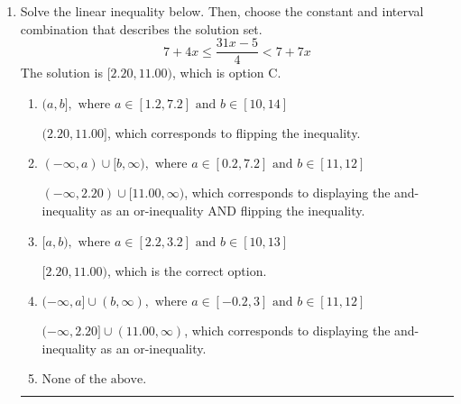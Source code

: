 \documentclass{extbook}[14pt]
\newcommand{\litem}[1]{\item #1

\rule{\textwidth}{0.4pt}}
\begin{document}
\begin{enumerate}
{\begin{enumerate}[label=\Alph*.]
 $(-1.539, \infty)$, which corresponds to switching the direction of the interval AND negating the endpoint. You likely did this if you did not flip the inequality when dividing by a negative as well as not moving values over to a side properly.
\item \( (-\infty, a), \text{ where } a \in [-3.7, -0.4] \)

 $(-\infty, -1.539)$, which corresponds to negating the endpoint of the solution.
\item \( (a, \infty), \text{ where } a \in [0.54, 3.54] \)

 $(1.539, \infty)$, which corresponds to switching the direction of the interval. You likely did this if you did not flip the inequality when dividing by a negative!
\item \( \text{None of the above}. \)

You may have chosen this if you thought the inequality did not match the ends of the intervals.
\end{enumerate}

\textbf{General Comment:} Remember that less/greater than or equal to includes the endpoint, while less/greater do not. Also, remember that you need to flip the inequality when you multiply or divide by a negative.
}
\litem{
Solve the linear inequality below. Then, choose the constant and interval combination that describes the solution set.
\[ 7 + 4 x \leq \frac{31 x - 5}{4} < 7 + 7 x \]The solution is \( [2.20, 11.00) \), which is option C.\begin{enumerate}[label=\Alph*.]
\item \( (a, b], \text{ where } a \in [1.2, 7.2] \text{ and } b \in [10, 14] \)

$(2.20, 11.00]$, which corresponds to flipping the inequality.
\item \( (-\infty, a) \cup [b, \infty), \text{ where } a \in [0.2, 7.2] \text{ and } b \in [11, 12] \)

$(-\infty, 2.20) \cup [11.00, \infty)$, which corresponds to displaying the and-inequality as an or-inequality AND flipping the inequality.
\item \( [a, b), \text{ where } a \in [2.2, 3.2] \text{ and } b \in [10, 13] \)

$[2.20, 11.00)$, which is the correct option.
\item \( (-\infty, a] \cup (b, \infty), \text{ where } a \in [-0.2, 3] \text{ and } b \in [11, 12] \)

$(-\infty, 2.20] \cup (11.00, \infty)$, which corresponds to displaying the and-inequality as an or-inequality.
\item \( \text{None of the above.} \)



\end{enumerate}}
\end{enumerate}
\end{document}
